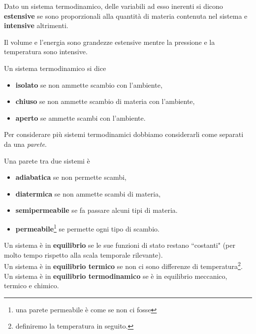 \documentclass[a4paper]{report}
\begin{document}
\begin{definition}
Dato un sistema termodinamico, delle variabili ad esso inerenti si dicono \textbf{estensive} se sono proporzionali alla quantit\`a di materia contenuta nel sistema e \textbf{intensive} altrimenti.
\end{definition}

\begin{example}
Il volume e l'energia sono grandezze estensive mentre la pressione e la temperatura sono intensive.
\end{example}

\begin{definition}
Un sistema termodinamico si dice 
\begin{itemize}
\item \textbf{isolato} se non ammette scambio con l'ambiente,
\item \textbf{chiuso} se non ammette scambio di materia con l'ambiente,
\item \textbf{aperto} se ammette scambi con l'ambiente.
\end{itemize}
\end{definition}

Per considerare pi\`u sistemi termodinamici dobbiamo considerarli come separati da una \textit{parete}.

\begin{definition}
Una parete tra due sistemi \`e
\begin{itemize}
\item \textbf{adiabatica} se non permette scambi,
\item \textbf{diatermica} se non ammette scambi di materia,
\item \textbf{semipermeabile} se fa passare alcuni tipi di materia.
\item \textbf{permeabile}\footnote{una parete permeabile \`e come se non ci fosse} se permette ogni tipo di scambio.
\end{itemize}
\end{definition}

\begin{definition}[Equilibrio]
Un sistema \`e in \textbf{equilibrio} se le sue funzioni di stato restano ``costanti" (per molto tempo rispetto alla scala temporale rilevante).\\
Un sistema \`e in \textbf{equilibrio termico} se non ci sono differenze di temperatura\footnote{definiremo la temperatura in seguito.}.\\
Un sistema \`e in \textbf{equilibrio termodinamico} se \`e in equilibrio meccanico, termico e chimico.
\end{definition}
\end{document}
